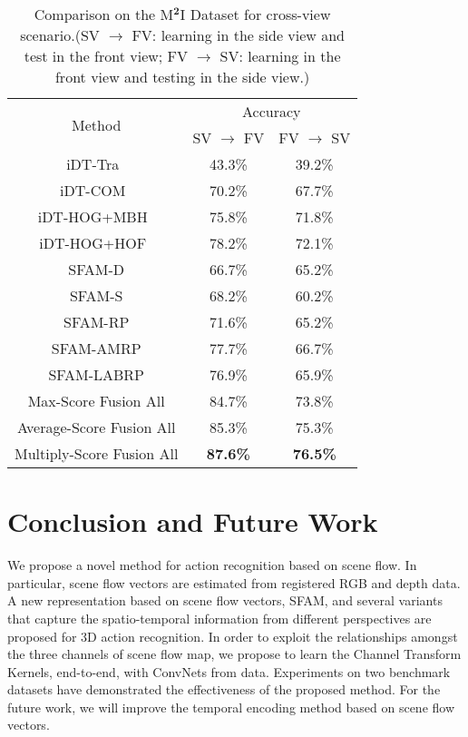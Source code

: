 \documentclass[10pt,twocolumn,letterpaper]{article}
\begin{document}
\begin{table}[!ht]
\centering
\begin{tabular}{|c|c|c|} \hline 
\multirow{2}{*}{Method} 
& \multicolumn{2}{c|}{Accuracy}\\
 \cline{2-3}   
 & SV $\rightarrow$ FV  & FV $\rightarrow$ SV  \\ \hline
   iDT-Tra~\cite{liu2016benchmarking} & 43.3\%  & 39.2\% \\ \hline
   iDT-COM~\cite{liu2016benchmarking} & 70.2\%  & 67.7\% \\ \hline
   iDT-HOG+MBH~\cite{liu2016benchmarking} & 75.8\%  & 71.8\% \\ \hline
   iDT-HOG+HOF~\cite{liu2016benchmarking} & 78.2\%  & 72.1\% \\ \hline\hline
   SFAM-D & 66.7\%  & 65.2\% \\ \hline
   SFAM-S & 68.2\%  & 60.2\% \\ \hline
   SFAM-RP & 71.6\%  & 65.2\% \\ \hline
   SFAM-AMRP & 77.7\%  & 66.7\% \\ \hline
   SFAM-LABRP & 76.9\%  & 65.9\% \\ \hline
   Max-Score Fusion All & 84.7\%  & 73.8\% \\ \hline
   Average-Score Fusion All & 85.3\%  & 75.3\% \\ \hline
   Multiply-Score Fusion All & \textbf{87.6\%}  & \textbf{76.5\%} \\ \hline
\end{tabular}
\caption{Comparison on the M$^{\textbf{2}}$I Dataset 
for cross-view scenario.(SV $\rightarrow$ FV: learning in the side view and 
test in the front view; FV $\rightarrow$ SV: learning in the front view and 
testing in the side view.) \label{table3}}
\end{table}




\section{Conclusion and Future Work}\label{conclusion}
We propose a novel method for action recognition based on scene flow. 
In particular, scene flow vectors are estimated from registered RGB and depth 
data. A new representation based on scene flow vectors, SFAM, and several 
variants that capture the spatio-temporal information from different 
perspectives are proposed for 3D action recognition. In order to exploit the 
relationships amongst the three channels of scene flow map, we propose to learn 
the Channel Transform Kernels, end-to-end, with  ConvNets from data. 
Experiments on two benchmark datasets have demonstrated the effectiveness of the 
proposed method. For the future work, we will improve the temporal encoding 
method based on scene flow vectors. 
\end{document}

